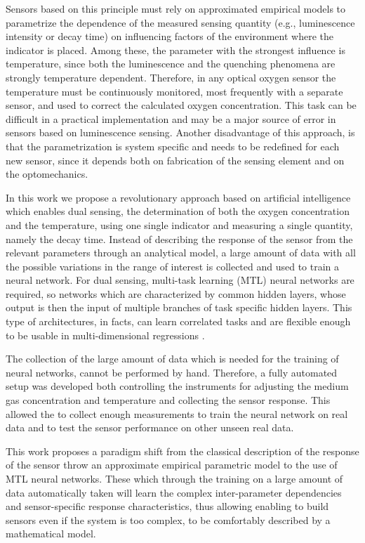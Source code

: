\documentclass[9pt,twocolumn,twoside,pdftex]{optica}
\begin{document}
Sensors based on this principle must rely on approximated empirical models to parametrize the dependence of the measured sensing quantity (e.g., luminescence intensity or decay time) on influencing factors of the environment where the indicator is placed. Among these, the parameter with the strongest influence is temperature, since both the luminescence and the quenching phenomena are strongly temperature dependent. Therefore, in any optical oxygen sensor the temperature must be continuously monitored, most frequently with a separate sensor, and used to correct the calculated oxygen concentration. This task can be difficult in a practical implementation and may be a major source of error in sensors based on luminescence sensing. Another disadvantage of this approach, is that the parametrization is system specific and needs to be redefined for each new sensor, since it depends both on fabrication of the sensing element \cite{Xu1994,Draxler1995,Hartmann1996,Mills1998,Badocco2008,Dini2011} and on the optomechanics.

In this work we propose a revolutionary approach based on artificial intelligence which enables dual sensing, the determination of both the oxygen concentration and the temperature, using one single indicator and measuring a single quantity, namely the decay time. Instead of describing the response of the sensor from the relevant parameters through an analytical model, a large amount of data with all the possible variations in the range of interest is collected and used to train a neural network. For dual sensing,  multi-task learning (MTL) neural networks are required, so networks which are characterized by common hidden layers, whose output is then the input of multiple branches of task specific hidden layers. This type of architectures, in facts, can learn correlated tasks \cite{Thrun1996, Caruana1997, Zhang2017, Baxter2000, Thung2018} and are flexible enough to be usable in multi-dimensional regressions \cite{Michelucci2019_2}.

The collection of the large amount of data which is needed for the training of neural networks, cannot be performed by hand. Therefore, a fully automated setup was developed  both controlling the instruments for adjusting the medium gas concentration and temperature and collecting the sensor response. This allowed the to collect enough measurements to train the neural network on real data and to test the sensor performance on other unseen real data.

This work proposes a paradigm shift from the classical description of the response of the sensor throw an approximate empirical parametric model to the use of MTL neural networks. These which through the training on a large amount of data automatically taken will learn the complex inter-parameter dependencies and sensor-specific response characteristics, thus allowing enabling to build sensors even if the system is too complex, to be comfortably described by a mathematical model.
\end{document}
